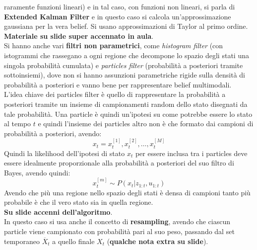 \documentclass[a4paper,12pt, oneside]{book}
\begin{document}
raramente funzioni lineari) e in tal caso, con funzioni non 
lineari, si parla di \textbf{Extended Kalman Filter} e in questo caso si calcola
un'approssimazione gaussiana per la vera belief. Si usano approssimazioni di
Taylor al primo ordine. \textbf{Materiale su slide super accennato in aula}.\\
Si hanno anche vari \textbf{filtri non parametrici}, come \textit{histogram
  filter} (con istogrammi che rassegano a ogni regione che decompone lo spazio
degli stati una singola probabilità cumulata) e \textit{particles filter}
(probabilità a posteriori tramite 
sottoinsiemi), dove non si hanno assunzioni parametriche 
rigide sulla densità di probabilità a posteriori e vanno bene per rappresentare
belief multimodali.\\
L'idea chiave dei particles filter è quello di rappresentare la probabilità a
posteriori tramite un insieme di campionamenti random dello stato disegnati da
tale probabilità. Una particle è quindi un'ipotesi su come potrebbe essere lo
stato al tempo $t$ e quindi l'insieme dei particles altro non è che formato dai
campioni di probabilità a posteriori, avendo:
\[x_t=x_t^{[1]}, x_t^{[2]},\ldots,x_t^{[M]}\]
Quindi la likelihood dell'ipotesi di stato $x_t$ per essere inclusa tra i
particles deve essere idealmente proporzionale alla probabilità a posteriori del
suo filtro di Bayes, avendo quindi:
\[x_t^{[m]}\sim P(x_t|z_{1:t},u_{1:t})\]
Avendo che più una regione nello spazio degli stati è densa di campioni tanto
più probabile è che il vero stato sia in quella regione. \\
\textbf{Su slide accenni dell'algoritmo}.\\
In questo caso si usa anche il concetto di \textbf{resampling}, avendo che
ciascun particle viene campionato con probabilità pari al suo peso, passando dal
set temporaneo $\overline{X}_t$ a quello finale $X_t$ (\textbf{qualche nota
  extra su slide}).
\end{document}
